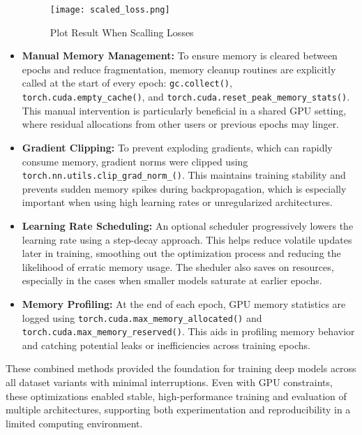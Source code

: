 \begin{itemize}
    \begin{figure}[H]
        \centering
        \texttt{[image: scaled\_loss.png]}
        \caption{Plot Result When Scalling Losses}
        \label{fig:scaled_loss}
    \end{figure}


    \item \textbf{Manual Memory Management:} To ensure memory is cleared between epochs and reduce fragmentation, memory cleanup routines are explicitly called at the start of every epoch: \texttt{gc.collect()}, \texttt{torch.cuda.empty\_cache()}, and \texttt{torch.cuda.reset\_peak\_memory\_stats()}. This manual intervention is particularly beneficial in a shared GPU setting, where residual allocations from other users or previous epochs may linger.

    \item \textbf{Gradient Clipping:} To prevent exploding gradients, which can rapidly consume memory, gradient norms were clipped using \texttt{torch.nn.utils.clip\_grad\_norm\_()}. This maintains training stability and prevents sudden memory spikes during backpropagation, which is especially important when using high learning rates or unregularized architectures.

    \item \textbf{Learning Rate Scheduling:} An optional scheduler progressively lowers the learning rate using a step-decay approach. This helps reduce volatile updates later in training, smoothing out the optimization process and reducing the likelihood of erratic memory usage. The sheduler also saves on resources, especially in the cases when smaller models saturate at earlier epochs.

    \item \textbf{Memory Profiling:} At the end of each epoch, GPU memory statistics are logged using \texttt{torch.cuda.max\_memory\_allocated()} and \texttt{torch.cuda.max\_memory\_reserved()}. This aids in profiling memory behavior and catching potential leaks or inefficiencies across training epochs. 
\end{itemize}

These combined methods provided the foundation for training deep models across all dataset variants with minimal interruptions. Even with GPU constraints, these optimizations enabled stable, high-performance training and evaluation of multiple architectures, supporting both experimentation and reproducibility in a limited computing environment.
